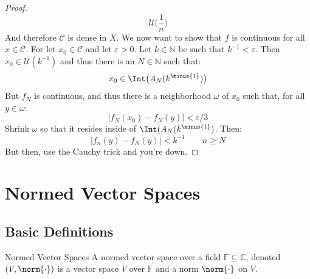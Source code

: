 \documentclass[crop=false,class=book,oneside]{standalone}
\begin{document}
\begin{proof}
\begin{equation}
                    \mathcal{U}\big(\frac{1}{n}\big)
            \end{equation}
            And therefore $\mathcal{C}$ is dense in $X$. We
            now want to show that $f$ is continuous for all
            $x\in\mathcal{C}$. For let $x_{0}\in\mathcal{C}$ and
            let $\varepsilon>0$. Let $k\in\mathbb{N}$ be such that
            $k^{\minus{1}}<\varepsilon$. Then
            $x_{0}\in\mathcal{U}(k^{\minus{1}})$ and thus there is
            an $N\in\mathbb{N}$ such that:
            \begin{equation}
                x_{0}\in\Int\big(A_{N}(k^{\minus{1}})\big)
            \end{equation}
            But $f_{N}$ is continuous, and thus there is a
            neighborhood $\omega$ of $x_{0}$ such that, for all
            $y\in\omega$:
            \begin{equation}
                |f_{N}(x_{0})-f_{N}(y)|<\varepsilon/3
            \end{equation}
            Shrink $\omega$ so that it resides inside of
            $\Int(A_{N}(k^{\minus{1}})$. Then:
            \begin{equation}
                |f_{n}(y)-f_{N}(y)|<k^{\minus{1}}
                \quad\quad
                n\geq{N}
            \end{equation}
            But then, use the Cauchy trick and you're down.
        \end{proof}
    \section{Normed Vector Spaces}
        \subsection{Basic Definitions}
            \begin{ldefinition}{Normed Vector Spaces}
                A normed vector space over a field
                $\mathbb{F}\subseteq\mathbb{C}$, denoted
                $(V,\norm{\cdot})$ is a vector space $V$ over
                $\mathbb{F}$ and a norm $\norm{\cdot}$ on $V$.
            \end{ldefinition}
\end{document}
